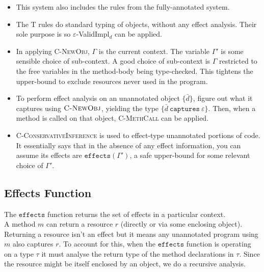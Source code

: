 \documentclass{llncs}
\newcommand{\keywadj}[1]{\mathtt{#1}}
\newcommand{\keyw}[1]{\keywadj{#1}~}
\begin{document}
\begin{itemize}
	\item This system also includes the rules from the fully-annotated system.
	\item The \textsc{T} rules do standard typing of objects, without any effect analysis. Their sole purpose is so $\varepsilon$-ValidImpl$_d$ can be applied.
	\item In applying \textsc{C-NewObj}, $\Gamma$ is the current context. The variable $\Gamma'$ is some sensible choice of sub-context. A good choice of sub-context is $\Gamma$ restricted to the free variables in the method-body being type-checked. This tightens the upper-bound to exclude resources never used in the program.
	\item To perform effect analysis on an unannotated object $\{ \bar d \}$, figure out what it captures using $\textsc{C-NewObj}$, yielding the type $\{ \bar d~\keyw{captures} \varepsilon \}$. Then, when a method is called on that object, \textsc{C-MethCall} can be applied.
	\item \textsc{C-ConservativeInference} is used to effect-type unannotated portions of code. It essentially says that in the absence of any effect information, you can assume its effects are $\keywadj{effects(\Gamma')}$, a safe upper-bound for some relevant choice of $\Gamma'$.
\end{itemize}

\subsection{Effects Function}

\noindent
The $\keywadj{effects}$ function returns the set of effects in a particular context. \\

\noindent
A method $m$ can return a resource $r$ (directly or via some enclosing object). Returning a resource isn't an effect but it means any unannotated program using $m$ also captures $r$. To account for this, when the $\keywadj{effects}$ function is operating on a type $\tau$ it must analyse the return type of the method declarations in $\tau$. Since the resource might be itself enclosed by an object, we do a recursive analysis.
\end{document}
